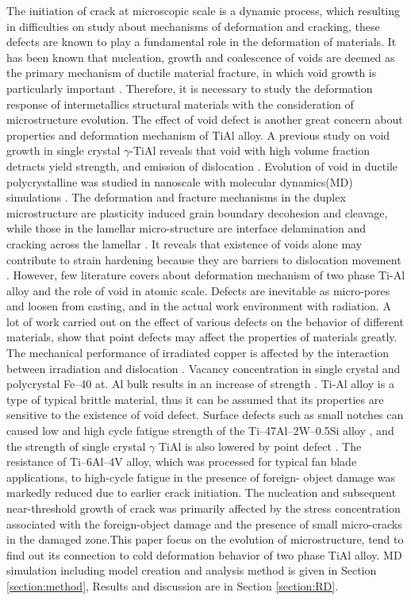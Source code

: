 \documentclass[metals,article,submit,moreauthors,pdftex,10pt,a4paper]{Definitions/mdpi}
\begin{document}
The initiation of crack at microscopic scale is a dynamic process, which resulting in difficulties on study about  mechanisms of deformation and cracking, these defects are known to play a fundamental role in the deformation of materials. It has been known that nucleation, growth and coalescence of voids are deemed as the primary mechanism of ductile material fracture, in which void growth is particularly important \cite{Hempel2017a}. Therefore, it is necessary to study the deformation response of intermetallics structural materials with the consideration of microstructure evolution. The effect of void defect is another great concern about properties and deformation mechanism  of TiAl alloy. A previous study on void growth in single crystal $\gamma$-TiAl reveals that void with high volume fraction detracts yield strength, and emission of dislocation \cite{Tang2014, Xu2011}. Evolution of void in ductile polycrystalline was studied in nanoscale with molecular dynamics(MD) simulations \cite{Jing2018a,Elkhateeb2018}. The deformation and fracture mechanisms in the duplex microstructure are plasticity induced grain boundary decohesion and cleavage, while those in the lamellar micro-structure are interface delamination and cracking across the lamellar \cite{Tang2014}. It reveals that existence of voids alone may contribute to strain hardening because they are barriers to dislocation movement \cite{Xiong2015}. However, few literature covers about deformation mechanism of two phase Ti-Al alloy and the role of void in atomic scale. Defects are inevitable as micro-pores and loosen from casting, and in the actual work environment with radiation. A lot of work carried out on the  effect of various defects on the behavior of different materials, show that point defects may affect the properties of materials greatly. The mechanical performance of irradiated copper is affected by the interaction between irradiation and dislocation \cite{Kiener2011}. Vacancy concentration in single crystal and polycrystal Fe–40 at. Al bulk results in an increase of strength \cite{Yang1998}. Ti-Al alloy is a type of typical brittle material, thus it can be assumed that its properties are sensitive to the existence of void defect. Surface defects such as small notches can caused low and high cycle fatigue strength of the Ti–47Al–2W–0.5Si alloy \cite{Nazmy2001}, and the strength of single crystal $\gamma$  TiAl is also lowered by point defect \cite{Wu2016}. The resistance of Ti–6Al–4V alloy, which was processed for typical fan blade applications, to high-cycle fatigue in the presence of foreign- object damage was markedly reduced due to earlier crack initiation.  The nucleation and subsequent near-threshold growth of crack was primarily affected by the stress concentration associated with the foreign-object damage and the presence of small micro-cracks in the damaged zone.This paper focus on the evolution of microstructure, tend to find out its connection to cold deformation behavior of two phase TiAl alloy. MD simulation including model creation and analysis method is given in Section \ref{section:method}, Results and discussion are in Section \ref{section:RD}.
\end{document}
